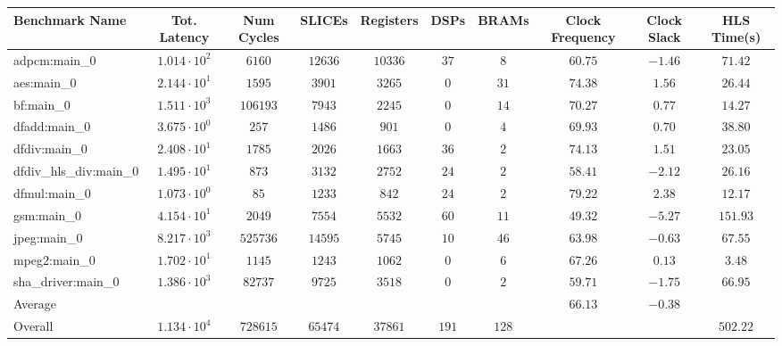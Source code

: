 \begin{tabular}{|l|c|c|c|c|c|c|c|c|c|}
\hline
Benchmark Name          & Tot. Latency           & Num Cycles & SLICEs    & Registers & DSPs    & BRAMs   & Clock Frequency & Clock Slack & HLS Time(s) \\
\hline
adpcm:main\_0           & $ 1.014 \cdot 10^{2} $ & $ 6160   $ & $ 12636 $ & $ 10336 $ & $ 37  $ & $ 8   $ & $ 60.75       $ & $ -1.46   $ & $ 71.42   $ \\
aes:main\_0             & $ 2.144 \cdot 10^{1} $ & $ 1595   $ & $ 3901  $ & $ 3265  $ & $ 0   $ & $ 31  $ & $ 74.38       $ & $ 1.56    $ & $ 26.44   $ \\
bf:main\_0              & $ 1.511 \cdot 10^{3} $ & $ 106193 $ & $ 7943  $ & $ 2245  $ & $ 0   $ & $ 14  $ & $ 70.27       $ & $ 0.77    $ & $ 14.27   $ \\
dfadd:main\_0           & $ 3.675 \cdot 10^{0} $ & $ 257    $ & $ 1486  $ & $ 901   $ & $ 0   $ & $ 4   $ & $ 69.93       $ & $ 0.70    $ & $ 38.80   $ \\
dfdiv:main\_0           & $ 2.408 \cdot 10^{1} $ & $ 1785   $ & $ 2026  $ & $ 1663  $ & $ 36  $ & $ 2   $ & $ 74.13       $ & $ 1.51    $ & $ 23.05   $ \\
dfdiv\_hls\_div:main\_0 & $ 1.495 \cdot 10^{1} $ & $ 873    $ & $ 3132  $ & $ 2752  $ & $ 24  $ & $ 2   $ & $ 58.41       $ & $ -2.12   $ & $ 26.16   $ \\
dfmul:main\_0           & $ 1.073 \cdot 10^{0} $ & $ 85     $ & $ 1233  $ & $ 842   $ & $ 24  $ & $ 2   $ & $ 79.22       $ & $ 2.38    $ & $ 12.17   $ \\
gsm:main\_0             & $ 4.154 \cdot 10^{1} $ & $ 2049   $ & $ 7554  $ & $ 5532  $ & $ 60  $ & $ 11  $ & $ 49.32       $ & $ -5.27   $ & $ 151.93  $ \\
jpeg:main\_0            & $ 8.217 \cdot 10^{3} $ & $ 525736 $ & $ 14595 $ & $ 5745  $ & $ 10  $ & $ 46  $ & $ 63.98       $ & $ -0.63   $ & $ 67.55   $ \\
mpeg2:main\_0           & $ 1.702 \cdot 10^{1} $ & $ 1145   $ & $ 1243  $ & $ 1062  $ & $ 0   $ & $ 6   $ & $ 67.26       $ & $ 0.13    $ & $ 3.48    $ \\
sha\_driver:main\_0     & $ 1.386 \cdot 10^{3} $ & $ 82737  $ & $ 9725  $ & $ 3518  $ & $ 0   $ & $ 2   $ & $ 59.71       $ & $ -1.75   $ & $ 66.95   $ \\
\hline
Average                 & $                    $ & $        $ & $       $ & $       $ & $     $ & $     $ & $ 66.13       $ & $ -0.38   $ & $         $ \\
\hline
Overall                 & $ 1.134 \cdot 10^{4} $ & $ 728615 $ & $ 65474 $ & $ 37861 $ & $ 191 $ & $ 128 $ & $             $ & $         $ & $ 502.22  $ \\
\hline
\end{tabular}
